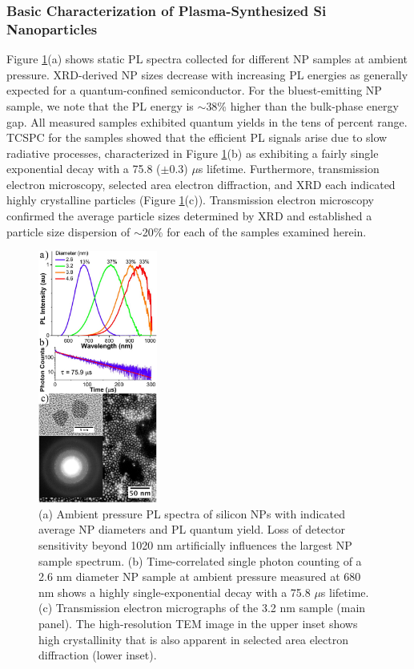 \subsubsection{Basic Characterization of Plasma-Synthesized Si Nanoparticles}
Figure \ref{f:sipressure1}(a) shows static PL spectra collected for different NP samples at ambient pressure. XRD-derived NP sizes decrease with increasing PL energies as generally expected for a quantum-confined semiconductor. For the bluest-emitting NP sample, we note that the PL energy is $\sim$38\% higher than the bulk-phase energy gap. All measured samples exhibited quantum yields in the tens of percent range. TCSPC for the samples showed that the efficient PL signals arise due to slow radiative processes, characterized in Figure \ref{f:sipressure1}(b) as exhibiting a fairly single exponential decay with a 75.8 ($\pm$0.3) $\mu$s lifetime. Furthermore, transmission electron microscopy, selected area electron diffraction, and XRD each indicated highly crystalline particles (Figure \ref{f:sipressure1}(c)). Transmission electron microscopy confirmed the average particle sizes determined by XRD and established a particle size dispersion of $\sim$20\% for each of the samples examined herein. \par

\begin{figure}
\begin{center}
\includegraphics[width=0.35\textwidth]{./Chapter6/sipressure1.jpeg}
\caption[Basic characterization of various sizes of plasma-synthesized Si NPs.]{(a) Ambient pressure PL spectra of silicon NPs with indicated average NP diameters and PL quantum yield. Loss of detector sensitivity beyond 1020 nm artificially influences the largest NP sample spectrum. (b) Time-correlated single photon counting of a 2.6 nm diameter NP sample at ambient pressure measured at 680 nm shows a highly single-exponential decay with a 75.8 $\mu$s lifetime. (c) Transmission electron micrographs of the 3.2 nm sample (main panel). The high-resolution TEM image in the upper inset shows high crystallinity that is also apparent in selected area electron diffraction (lower inset).}
\label{f:sipressure1}
\end{center}
\end{figure}

